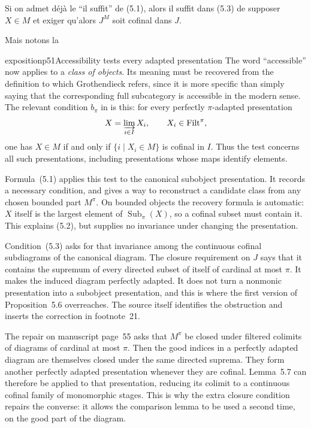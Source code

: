 Si on admet déjà le ``il suffit'' de (5.1), alors il suffit dans (5.3) de supposer $X \in M$ et exiger qu'alors $J^{M}$ soit cofinal dans $J$.

Mais notons la

\begin{dcomment}{exposition}{p51}{Accessibility tests every adapted presentation}
The word ``accessible'' now applies to a \emph{class of objects}. Its meaning must be recovered from the definition to which Grothendieck refers, since it is more specific than simply saying that the corresponding full subcategory is accessible in the modern sense. The relevant condition $b_\pi$ in \citep[Chapter~XIII, manuscript pp.~88--89]{GrothendieckDerivateursXIII} is this: for every perfectly $\pi$-adapted presentation
\[
 X=\varinjlim_{i\in I}X_i,\qquad X_i\in\mathrm{Filt}^\pi,
\]
one has $X\in M$ if and only if $\{i\mid X_i\in M\}$ is cofinal in $I$. Thus the test concerns all such presentations, including presentations whose maps identify elements.

Formula~(5.1) applies this test to the canonical subobject presentation. It records a necessary condition, and gives a way to reconstruct a candidate class from any chosen bounded part $M^\pi$. On bounded objects the recovery formula is automatic: $X$ itself is the largest element of $\operatorname{Sub}_{\pi}(X)$, so a cofinal subset must contain it. This explains (5.2), but supplies no invariance under changing the presentation.

Condition~(5.3) asks for that invariance among the continuous cofinal subdiagrams of the canonical diagram. The closure requirement on $J$ says that it contains the supremum of every directed subset of itself of cardinal at most $\pi$. It makes the induced diagram perfectly adapted. It does not turn a nonmonic presentation into a subobject presentation, and this is where the first version of Proposition~5.6 overreaches. The source itself identifies the obstruction and inserts the correction in footnote~21.

The repair on manuscript page~55 asks that $M^\pi$ be closed under filtered colimits of diagrams of cardinal at most $\pi$. Then the good indices in a perfectly adapted diagram are themselves closed under the same directed suprema. They form another perfectly adapted presentation whenever they are cofinal. Lemma~5.7 can therefore be applied to that presentation, reducing its colimit to a continuous cofinal family of monomorphic stages. This is why the extra closure condition repairs the converse: it allows the comparison lemma to be used a second time, on the good part of the diagram.
\end{dcomment}


